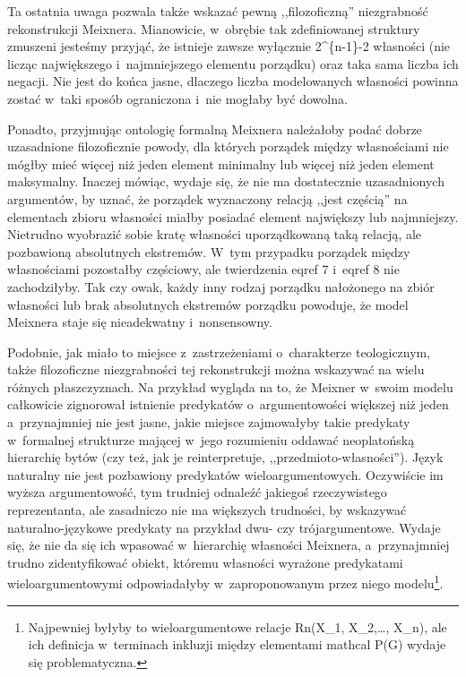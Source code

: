Ta ostatnia uwaga pozwala także wskazać pewną ,,filozoficzną'' niezgrabność rekonstrukcji Meixnera. Mianowicie, w~obrębie tak zdefiniowanej struktury zmuszeni jesteśmy przyjąć, że istnieje zawsze wyłącznie 2\^{}\{n-1\}-2 własności (nie licząc największego i~najmniejszego elementu porządku) oraz taka sama liczba ich negacji. Nie jest do końca jasne, dlaczego liczba modelowanych własności powinna zostać w~taki sposób ograniczona i~nie mogłaby być dowolna.

Ponadto, przyjmując ontologię formalną Meixnera należałoby podać dobrze uzasadnione filozoficznie powody, dla których porządek między własnościami nie mógłby mieć więcej niż jeden element minimalny lub więcej niż jeden element maksymalny. Inaczej mówiąc, wydaje się, że nie ma dostatecznie uzasadnionych argumentów, by uznać, że porządek wyznaczony relacją ,,jest częścią'' na elementach zbioru własności miałby posiadać element największy lub najmniejszy. Nietrudno wyobrazić sobie kratę własności uporządkowaną taką relacją, ale pozbawioną absolutnych ekstremów. W~tym przypadku porządek między własnościami pozostałby częściowy, ale twierdzenia eqref 7 i~eqref 8 nie zachodziłyby. Tak czy owak, każdy inny rodzaj porządku nałożonego na zbiór własności lub brak absolutnych ekstremów porządku powoduje, że model Meixnera staje się nieadekwatny i~nonsensowny.

Podobnie, jak miało to miejsce z~zastrzeżeniami o~charakterze teologicznym, także filozoficzne niezgrabności tej rekonstrukcji można wskazywać na wielu różnych płaszczyznach. Na przykład wygląda na to, że Meixner w~swoim modelu całkowicie zignorował istnienie predykatów o~argumentowości większej niż jeden a~przynajmniej nie jest jasne, jakie miejsce zajmowałyby takie predykaty w~formalnej strukturze mającej w~jego rozumieniu oddawać neoplatońską hierarchię bytów (czy też, jak je reinterpretuje, ,,przedmioto-własności''). Język naturalny nie jest pozbawiony predykatów wieloargumentowych. Oczywiście im wyższa argumentowość, tym trudniej odnaleźć jakiegoś rzeczywistego reprezentanta, ale zasadniczo nie ma większych trudności, by wskazywać naturalno-językowe predykaty na przykład dwu- czy trójargumentowe. Wydaje się, że nie da się ich wpasować w~hierarchię własności Meixnera, a~przynajmniej trudno zidentyfikować obiekt, któremu własności wyrażone predykatami wieloargumentowymi odpowiadałyby w~zaproponowanym przez niego modelu\footnote{ Najpewniej byłyby to wieloargumentowe relacje Rn(X\_1, X\_2,…, X\_n), ale ich definicja w~terminach inkluzji między elementami mathcal P(G) wydaje się problematyczna.}.

